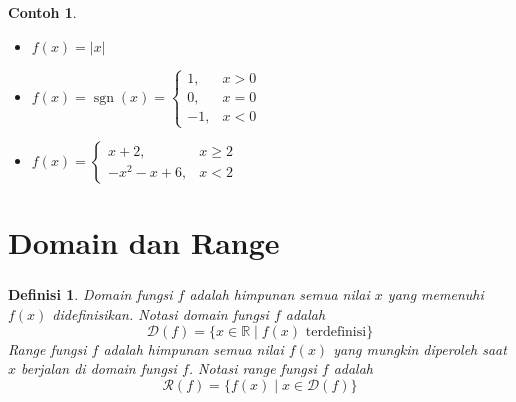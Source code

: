 \documentclass[aspectratio=169]{beamer}
\DeclareMathOperator{\sign}{sgn}
\newtheorem{definisi}{Definisi}
\theoremstyle{definition}
\newtheorem*{contoh}{Contoh}
\newcommand{\R}{\mathbb{R}}
\newcommand{\dom}{\mathcal{D}}
\newcommand{\rng}{\mathcal{R}}
\begin{document}
    \begin{frame}
        \frametitle{\insertsection}
        \begin{contoh}
            \begin{itemize}[label=$\checkmark$]
                \item $f(x)=|x|$
                \item $f(x)=\sign(x)=\begin{cases}
                    1, & x>0\\
                    0, & x=0\\
                    -1, & x<0
                \end{cases}$
                \item $f(x)=\begin{cases}
                    x+2, & x\geq 2\\
                    -x^2-x+6, & x<2
                \end{cases}$
            \end{itemize}
        \end{contoh}
    \end{frame}

    \section{Domain dan Range}
    \begin{frame}
        \frametitle{\insertsection}
        \begin{definisi}
            Domain fungsi $f$ adalah himpunan semua nilai $x$ yang memenuhi $f(x)$ didefinisikan. Notasi domain fungsi $f$ adalah \[\dom(f)=\{x\in\R\mid f(x)\text{ terdefinisi}\}\]
            Range fungsi $f$ adalah himpunan semua nilai $f(x)$ yang mungkin diperoleh saat $x$ berjalan di domain fungsi $f$. Notasi range fungsi $f$ adalah \[\rng(f)=\{f(x)\mid x\in\dom(f)\}\]
        \end{definisi}
    \end{frame}
\end{document}
